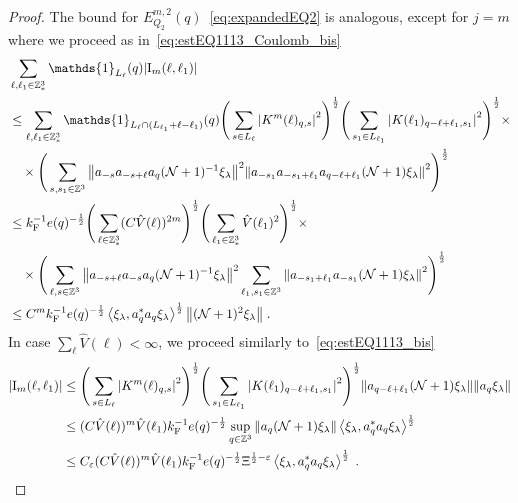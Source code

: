 \documentclass[12pt,a4paper]{article}
\numberwithin{equation}{section}
\newcommand{\1}{\mathbb{I}}
\newcommand{\F}{\mathrm{F}}
\newcommand{\I}{\mathrm{I}}
\newcommand{\Z}{\mathbb{Z}}
\newcommand{\NN}{\mathcal{N}}
\newcommand{\half}{\frac{1}{2}}
\newcommand{\eva}[1]{\left\langle #1 \right\rangle}
\theoremstyle{plain}
\theoremstyle{definition}
\theoremstyle{remark}
\theoremstyle{plain}
\theoremstyle{definition}
\theoremstyle{remark}
\begin{document}
\begin{proof}
The bound for $ E^{m,2}_{Q_2}(q) $~\eqref{eq:expandedEQ2} is analogous, except for $ j = m $ where we proceed as in~\eqref{eq:estEQ1113_Coulomb_bis}
\begin{align}
	&\sum_{\ell,\ell_1 \in \Z^3_*} \mathds{1}_{L_\ell}(q) |\I_m(\ell, \ell_1)| \nonumber\\
	&\leq \sum_{\ell,\ell_1 \in \Z^3_*} \mathds{1}_{L_\ell \cap (L_{\ell_1}+\ell-\ell_1) }(q)
		\Bigg(\sum\limits_{s \in L_{\ell}} \abs{K^m(\ell)_{q,s}}^2\Bigg)^\half
		\Bigg(\sum\limits_{s_1 \in L_{\ell_1}} \abs{K(\ell_1)_{q-\ell+\ell_1,s_1}}^2\Bigg)^\half \times \nonumber\\
	&\quad \times \Bigg( \sum_{s,s_1 \in \Z^3} \norm{ a_{-s} a_{-s+\ell} a_q (\NN+1)^{-1} \xi_\lambda}^2
		\norm{ a_{-s_1} a_{-s_1+\ell_1} a_{q-\ell+\ell_1} (\NN+1) \xi_\lambda }^2 \Bigg)^{\half} \nonumber\\
	&\leq k_{\F}^{-1} e(q)^{-\frac 12}
		\Bigg(\sum_{\ell \in \Z^3_*} (C \hat{V}(\ell))^{2m} \Bigg)^\half
		\Bigg(\sum_{\ell_1 \in \Z^3_*} \hat{V}(\ell_1)^2 \Bigg)^\half \times \nonumber\\
	&\quad \times \Bigg( \sum_{\ell,s \in \Z^3} \norm{a_{-s+\ell} a_{-s} a_q (\NN+1)^{-1} \xi_\lambda}^2
		\sum_{\ell_1,s_1 \in \Z^3} \norm{a_{-s_1+\ell_1} a_{-s_1} (\NN+1) \xi_\lambda }^2 \Bigg)^{\half} \nonumber\\
	&\leq C^m k_{\F}^{-1} e(q)^{-\frac 12} \eva{\xi_\lambda, a_q^* a_q \xi_\lambda}^{\half} \norm{ (\NN+1)^2 \xi_\lambda } \;. \label{eq:estEQ2113_Coulomb_bis}
\end{align}
In case $ \sum_\ell \hat{V}(\ell) < \infty $, we proceed similarly to~\eqref{eq:estEQ1113_bis}
\begin{align}
	|\I_m(\ell, \ell_1)|
	&\leq \Bigg(\sum\limits_{s \in L_{\ell}} \abs{K^m(\ell)_{q,s}}^2\Bigg)^\half
		\Bigg(\sum\limits_{s_1 \in L_{\ell_1}} \abs{K(\ell_1)_{q-\ell+\ell_1,s_1}}^2\Bigg)^\half
		\norm{ a_{q-\ell+\ell_1} (\NN+1) \xi_\lambda}
		\norm{ a_q \xi_\lambda }\nonumber\\
	&\leq (C \hat{V}(\ell))^m \hat{V}(\ell_1) k_{\F}^{-1} e(q)^{-\half}
		\sup_{q \in \Z^3} \norm{ a_q (\NN+1) \xi_\lambda }
		\eva{\xi_\lambda, a_q^* a_q \xi_\lambda}^{\half} \nonumber\\
	&\leq C_\varepsilon (C \hat{V}(\ell))^m
		\hat{V}(\ell_1)
		k_{\F}^{-1} e(q)^{-\half} \Xi^{\half-\varepsilon} \eva{\xi_\lambda, a_q^* a_q \xi_\lambda}^{\half} \;. \label{eq:estEQ2113_bis}
\end{align}
\end{proof}
\end{document}

